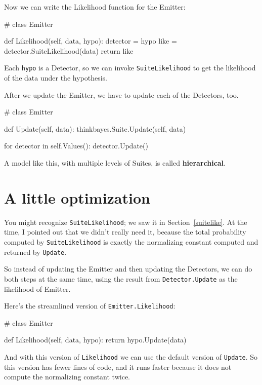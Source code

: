 \documentclass[12pt]{book}
\theoremstyle{exercise}
\newcommand{\py}[1]{{\tt #1}}%
\begin{document}
Now we can write the Likelihood function for the Emitter:

\begin{code}
# class Emitter

    def Likelihood(self, data, hypo):
        detector = hypo
        like = detector.SuiteLikelihood(data)
        return like
\end{code}

Each \py{hypo} is a Detector, so we can invoke
\py{SuiteLikelihood} to get the likelihood of the data under
the hypothesis.

After we update the Emitter, we have to update each of the
Detectors, too.

\begin{code}
# class Emitter

    def Update(self, data):
        thinkbayes.Suite.Update(self, data)

        for detector in self.Values():
            detector.Update()
\end{code}

A model like this, with multiple levels of Suites, is called {\bf
  hierarchical}.  


\section{A little optimization}

You might recognize \py{SuiteLikelihood}; we saw it
in Section~\ref{suitelike}.  At the time, I pointed out that
we didn't really need it, because the total probability
computed by \py{SuiteLikelihood} is exactly the normalizing
constant computed and returned by \py{Update}.

So instead of updating the Emitter and then updating the
Detectors, we can do both steps at the same time, using
the result from \py{Detector.Update} as the likelihood
of Emitter.

Here's the streamlined version of \py{Emitter.Likelihood}:

\begin{code}
# class Emitter

    def Likelihood(self, data, hypo):
        return hypo.Update(data)
\end{code}

And with this version of \py{Likelihood} we can use the
default version of \py{Update}.  So this version has fewer
lines of code, and it runs faster because it does not compute
the normalizing constant twice.
\end{document}
